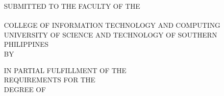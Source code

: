 \thispagestyle{empty}
\begingroup
\centering\bfseries
\setlength{\parindent}{0pt}

\ThesisTitleLines

\vspace{5\baselineskip}

SUBMITTED TO THE FACULTY OF THE\\
\DepartmentName\\
COLLEGE OF INFORMATION TECHNOLOGY AND COMPUTING\\
UNIVERSITY OF SCIENCE AND TECHNOLOGY OF SOUTHERN\\
PHILIPPINES\\
BY

\vspace{4\baselineskip}

\AuthorsLines

\vspace{4\baselineskip}

IN PARTIAL FULFILLMENT OF THE\\
REQUIREMENTS FOR THE\\
DEGREE OF

\vspace{2\baselineskip}

\DegreeFull

\vspace{3\baselineskip}

\SubmissionDate
\par
\endgroup
{}
